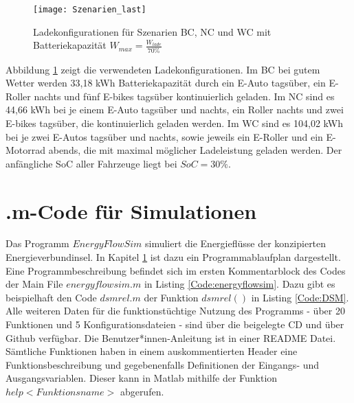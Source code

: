 		\begin{figure}[h]
			\centering
			\texttt{[image: Szenarien\_last]}
			\caption{Ladekonfigurationen für Szenarien BC, NC und WC mit Batteriekapazität $W_{max} = \frac{W_{lade}}{70 \%}$}
			\label{Abb:szenarien_last}
		\end{figure}        
        
        Abbildung \ref{Abb:szenarien_last} zeigt die verwendeten Ladekonfigurationen. Im BC bei gutem Wetter werden 33,18 kWh Batteriekapazität durch ein E-Auto tagsüber, ein E-Roller nachts und fünf E-bikes tagsüber kontinuierlich geladen. Im NC sind es 44,66 kWh bei je einem E-Auto tagsüber und nachts, ein Roller nachts und zwei E-bikes tagsüber, die kontinuierlich geladen werden. Im WC sind es 104,02 kWh bei je zwei E-Autos tagsüber und nachts, sowie jeweils ein E-Roller und ein E-Motorrad abends, die mit maximal möglicher Ladeleistung geladen werden. Der anfängliche SoC aller Fahrzeuge liegt bei $SoC = 30 \% $.\\ 
        				


\section{.m-Code für Simulationen}
	\label{Kap:Code}		
	Das Programm $EnergyFlowSim$ simuliert die Energieflüsse der konzipierten Energieverbundinsel. In Kapitel \ref{Kap:Code} ist dazu ein Programmablaufplan dargestellt. Eine Programmbeschreibung befindet sich im ersten Kommentarblock des Codes der Main File $energyflowsim.m$ in Listing \ref{Code:energyflowsim}. Dazu gibt es beispielhaft den Code $dsmrel.m$ der Funktion $dsmrel()$ in Listing \ref{Code:DSM}.\\

	Alle weiteren Daten für die funktionstüchtige Nutzung des Programms - über 20 Funktionen und 5 Konfigurationsdateien - sind über die beigelegte CD und über Github verfügbar. Die Benutzer*innen-Anleitung ist in einer README Datei. \cite{github_energyflowsim} \\
    
    Sämtliche Funktionen haben in einem auskommentierten Header eine Funktionsbeschreibung und gegebenenfalls Definitionen der Eingangs- und Ausgangsvariablen. Dieser kann in Matlab mithilfe der Funktion $help <Funktionsname>$ abgerufen.\\                


